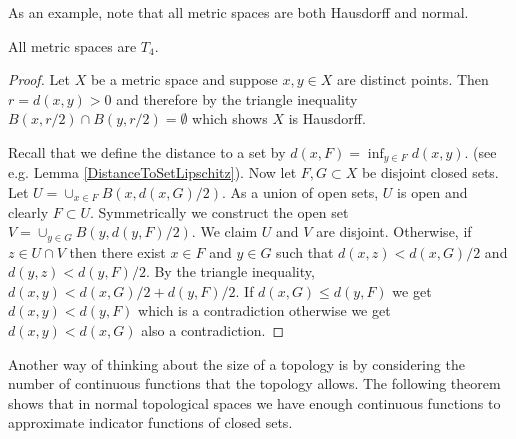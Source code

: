 As an example, note that all metric spaces are both Hausdorff and normal.
\begin{prop}\label{MetricSpacesAreT4}All metric spaces are $T_4$.
\end{prop}
\begin{proof}
  Let $X$ be a metric space and suppose $x, y \in X$ are distinct points.   Then $r = d(x,y)>0$ and therefore by the triangle inequality $B(x, r/2) \cap B(y, r/2) = \emptyset$ which shows $X$ is Hausdorff.

  Recall that we define the distance to a set by $d(x,F) = \inf_{y \in F} d(x,y)$.  (see e.g. Lemma
\ref{DistanceToSetLipschitz}).  Now let $F, G \subset X$ be disjoint closed sets.    Let $U = \cup_{x \in F} B(x, d(x,G)/2)$.   As a union of open sets, $U$ is open and clearly $F \subset U$.   Symmetrically we construct the open set $V = \cup_{y \in G} B(y, d(y, F)/2)$.   We claim $U$ and $V$ are disjoint.   Otherwise, if $z \in U \cap V$ then there exist $x \in F$ and $y \in G$ such that $d(x,z) < d(x,G)/2$ and $d(y,z) < d(y, F)/2$.   By the triangle inequality, $d(x,y) <  d(x,G)/2 + d(y, F)/2$.   If $d(x,G) \leq d(y, F)$ we get $d(x,y) < d(y,F)$ which is a contradiction otherwise we get $d(x,y) < d(x,G)$ also a contradiction.    
\end{proof}

Another way of
thinking about the size of a topology is by considering the number of
continuous functions that the topology allows.  The following theorem
shows that in normal topological spaces we have enough continuous
functions to approximate indicator functions of closed sets.

